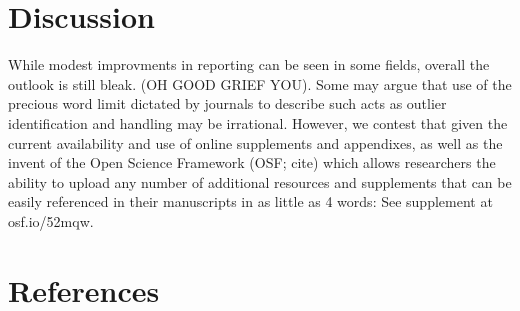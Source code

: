 \documentclass[english,man]{apa6}
\theoremstyle{definition}
\theoremstyle{definition}
\theoremstyle{definition}
\theoremstyle{remark}
\begin{document}
\section{Discussion}\label{discussion}

While modest improvments in reporting can be seen in some fields,
overall the outlook is still bleak. (OH GOOD GRIEF YOU). Some may argue
that use of the precious word limit dictated by journals to describe
such acts as outlier identification and handling may be irrational.
However, we contest that given the current availability and use of
online supplements and appendixes, as well as the invent of the Open
Science Framework (OSF; cite) which allows researchers the ability to
upload any number of additional resources and supplements that can be
easily referenced in their manuscripts in as little as 4 words: See
supplement at osf.io/52mqw.

\newpage

\section{References}\label{references}

\setlength{\parindent}{-0.5in} \setlength{\leftskip}{0.5in}
\end{document}

